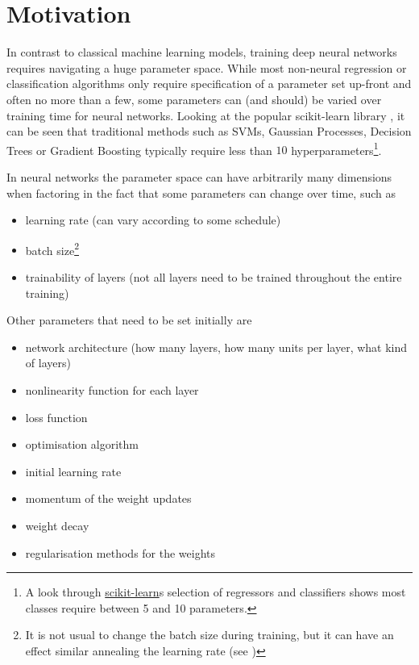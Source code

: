 \hypertarget{sec:motivation}{%
\section{Motivation}\label{sec:motivation}}

In contrast to classical machine learning models, training deep neural networks
requires navigating a huge parameter space. While most non-neural regression or
classification algorithms only require specification of a parameter set up-front
and often no more than a few, some parameters can (and should) be varied over
training time for neural networks. Looking at the popular scikit-learn library \citep{scikit-learn},
it can be seen that traditional methods such as SVMs, Gaussian Processes,
Decision Trees or Gradient Boosting typically require less than $10$
hyperparameters\footnote{A look through
\href{http://scikit-learn.org/stable/supervised_learning.html\#supervised-learning}{scikit-learn}s
selection of regressors and classifiers shows most classes require between 5 and
10 parameters.}.

In neural networks the parameter space can have arbitrarily many dimensions when
factoring in the fact that some parameters can change over time, such as

\begin{itemize}
    \item
        learning rate (can vary according to some schedule)
    \item
        batch size\footnote{It is not usual to change the batch size during
            training, but it can have an effect similar annealing the learning
        rate (see \cite{DBLP:journals/corr/abs-1711-00489})}
    \item
        trainability of layers (not all layers need to be trained throughout the
        entire training)
\end{itemize}

Other parameters that need to be set initially are

\begin{itemize}
    \item
        network architecture (how many layers, how many units per layer,
        what kind of layers)
    \item
        nonlinearity function for each layer
    \item
        loss function
    \item
        optimisation algorithm
    \item
        initial learning rate
    \item
        momentum of the weight updates
    \item
        weight decay
    \item
        regularisation methods for the weights
\end{itemize}

